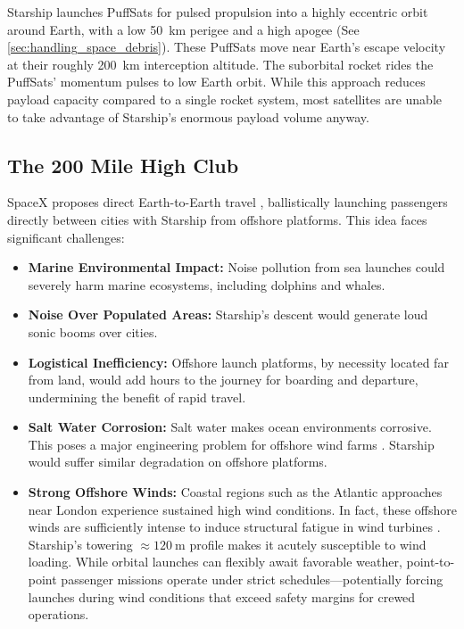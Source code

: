 \documentclass{article}
\begin{document}
{Starship launches PuffSats for pulsed propulsion into a highly eccentric orbit around Earth, with a low \SI{50}{\kilo\meter} perigee and a high apogee (See \autoref{sec:handling_space_debris}). These PuffSats move near Earth’s escape velocity at their roughly \SI{200}{\kilo\meter} interception altitude. The suborbital rocket rides the PuffSats'  momentum pulses to low Earth orbit. While this approach reduces payload capacity compared to a single rocket system, most satellites are unable to take advantage of Starship’s enormous payload volume anyway.

\subsection{The 200 Mile High Club} \label{sec:200_mile_high}
SpaceX proposes direct Earth-to-Earth travel \cite{earth_to_earth}, ballistically launching passengers directly between cities with Starship from offshore platforms. This idea faces significant challenges:
\begin{itemize}
\item \textbf{Marine Environmental Impact:} Noise pollution from sea launches could severely harm marine ecosystems, including dolphins and whales.
\item \textbf{Noise Over Populated Areas:} Starship's descent would generate loud sonic booms over cities.
\item \textbf{Logistical Inefficiency:} Offshore launch platforms, by necessity located far from land, would add hours to the journey for boarding and departure, undermining the benefit of rapid travel.
\item \textbf{Salt Water Corrosion:}  Salt water makes ocean environments corrosive.   This poses a major engineering problem for  offshore wind farms \cite{wind_turbine_corrosion}.   Starship would suffer similar degradation on offshore platforms.
\item \textbf{Strong Offshore Winds:} Coastal regions such as the Atlantic approaches near London experience sustained high wind conditions. In fact, these offshore winds are sufficiently intense to induce structural fatigue in wind turbines \cite{london_wind_fatigue}. Starship’s towering $\approx \SI{120}{\meter}$ profile \cite{starship} makes it acutely susceptible to wind loading. While orbital launches can flexibly await favorable weather, point-to-point passenger missions operate under strict schedules---potentially forcing launches during wind conditions that exceed safety margins for crewed operations.


\end{itemize}}
\end{document}
